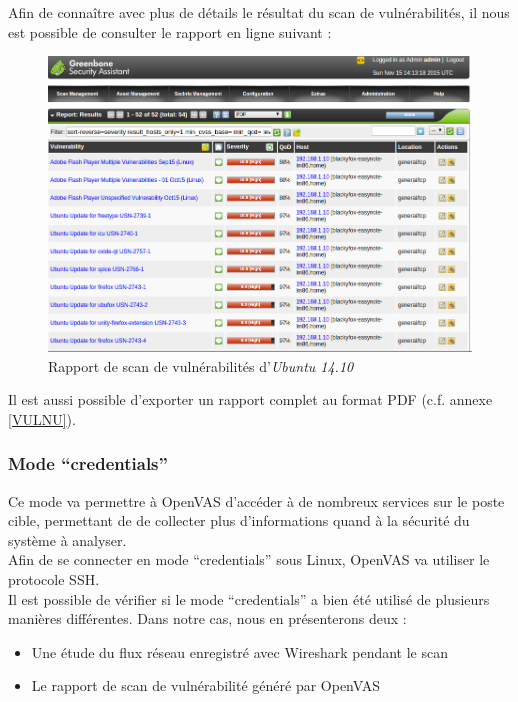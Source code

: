 Afin de connaître avec plus de détails le résultat du scan de vulnérabilités, il nous est possible de consulter le rapport en ligne suivant :
\begin{figure}[H]
    \centering
    \includegraphics[width=\textwidth]{img/repU.png}
    \caption{Rapport de scan de vulnérabilités d'\textit{Ubuntu 14.10}}
\end{figure}
Il est aussi possible d'exporter un rapport complet au format PDF (c.f. annexe \ref{VULNU}).

\subsubsection{Mode \enquote{credentials}}
Ce mode va permettre à OpenVAS d'accéder à de nombreux services sur le poste cible, permettant de de collecter plus d'informations quand à la sécurité du système à analyser.\\
Afin de se connecter en mode \enquote{credentials} sous Linux, OpenVAS va utiliser le protocole SSH.\\
Il est possible de vérifier si le mode \enquote{credentials} a bien été utilisé de plusieurs manières différentes. Dans notre cas, nous en présenterons deux :
\begin{itemize}
 \item Une étude du flux réseau enregistré avec Wireshark pendant le scan
 \item Le rapport de scan de vulnérabilité généré par OpenVAS
\end{itemize}


